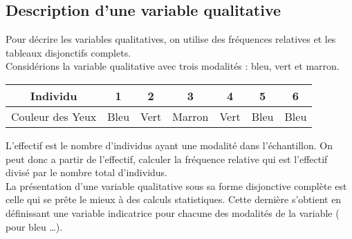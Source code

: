 \documentclass[a4paper]{article}
\begin{document}
\subsection{Description d'une variable qualitative}
Pour décrire les variables qualitatives, on utilise des fréquences relatives et les tableaux disjonctifs complets.\\

Considérions la variable qualitative  avec trois modalités : bleu, vert et marron.
\begin{center}
\begin{tabular}{|c|c|c|c|c|c|c|}
\hline
Individu         & 1    & 2    & 3      & 4    & 5    & 6    \\ \hline
Couleur des Yeux & Bleu & Vert & Marron & Vert & Bleu & Bleu \\ \hline
\end{tabular}
\end{center}
L'effectif est le nombre d'individus ayant une modalité dans l'échantillon. On peut donc a partir de l'effectif, calculer la fréquence relative
qui est l'effectif divisé par le nombre total d'individus. \\

La présentation d'une variable qualitative sous sa forme disjonctive complète est celle qui se prête le mieux à des calculs statistiques. Cette
dernière s'obtient en définissant une variable indicatrice pour chacune des modalités de la variable ( pour bleu \ldots). \\
\end{document}
